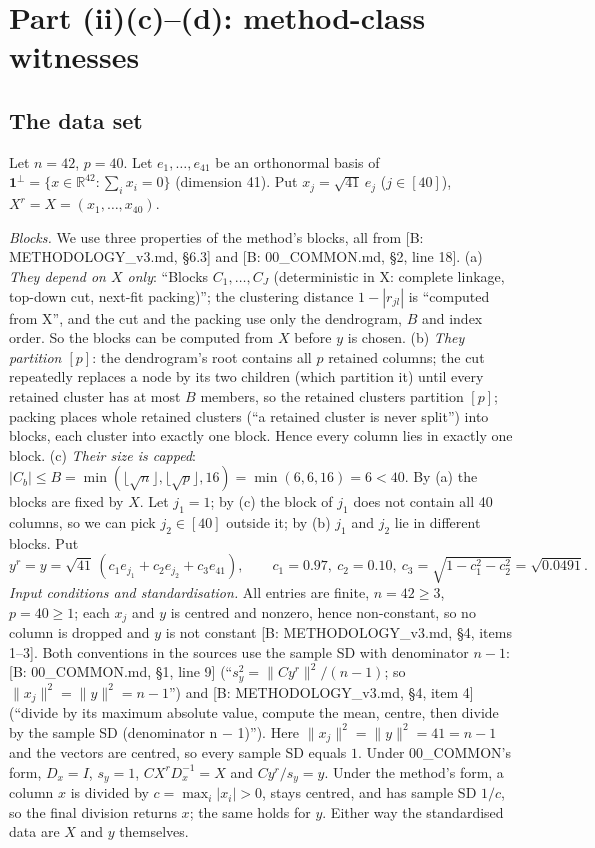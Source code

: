 \documentclass[11pt]{report}
\begin{document}
\section{Part (ii)(c)--(d): method-class witnesses}

\subsection{The data set}
Let $n=42$, $p=40$. Let $e_1,\dots,e_{41}$ be an orthonormal basis of $\mathbf 1^\perp=\{x\in\mathbb R^{42}:\sum_i x_i=0\}$ (dimension 41). Put $x_j=\sqrt{41}\,e_j$ ($j\in[40]$), $X^r=X=(x_1,\dots,x_{40})$.

\emph{Blocks.} We use three properties of the method's blocks, all from [B: METHODOLOGY\_v3.md, \S6.3] and [B: 00\_COMMON.md, \S2, line 18].
(a) \emph{They depend on $X$ only}: ``Blocks $C_1,\dots,C_J$ (deterministic in X: complete linkage, top-down cut, next-fit packing)''; the clustering distance $1-|r_{jl}|$ is ``computed from X'', and the cut and the packing use only the dendrogram, $B$ and index order. So the blocks can be computed from $X$ before $y$ is chosen.
(b) \emph{They partition $[p]$}: the dendrogram's root contains all $p$ retained columns; the cut repeatedly replaces a node by its two children (which partition it) until every retained cluster has at most $B$ members, so the retained clusters partition $[p]$; packing places whole retained clusters (``a retained cluster is never split'') into blocks, each cluster into exactly one block. Hence every column lies in exactly one block.
(c) \emph{Their size is capped}: $|C_b|\le B=\min(\lfloor\sqrt n\rfloor,\lfloor\sqrt p\rfloor,16)=\min(6,6,16)=6<40$.
By (a) the blocks are fixed by $X$. Let $j_1=1$; by (c) the block of $j_1$ does not contain all 40 columns, so we can pick $j_2\in[40]$ outside it; by (b) $j_1$ and $j_2$ lie in different blocks. Put
\[
y^r=y=\sqrt{41}\,(c_1e_{j_1}+c_2e_{j_2}+c_3e_{41}),\qquad c_1=0.97,\ c_2=0.10,\ c_3=\sqrt{1-c_1^2-c_2^2}=\sqrt{0.0491}.
\]
\emph{Input conditions and standardisation.} All entries are finite, $n=42\ge3$, $p=40\ge1$; each $x_j$ and $y$ is centred and nonzero, hence non-constant, so no column is dropped and $y$ is not constant [B: METHODOLOGY\_v3.md, \S4, items 1--3]. Both conventions in the sources use the sample SD with denominator $n-1$: [B: 00\_COMMON.md, \S1, line 9] (``$s_y^2=\|Cy^r\|^2/(n-1)$; so $\|x_j\|^2=\|y\|^2=n-1$'') and [B: METHODOLOGY\_v3.md, \S4, item 4] (``divide by its maximum absolute value, compute the mean, centre, then divide by the sample SD (denominator n $-$ 1)''). Here $\|x_j\|^2=\|y\|^2=41=n-1$ and the vectors are centred, so every sample SD equals $1$. Under 00\_COMMON's form, $D_x=I$, $s_y=1$, $CX^rD_x^{-1}=X$ and $Cy^r/s_y=y$. Under the method's form, a column $x$ is divided by $c=\max_i|x_i|>0$, stays centred, and has sample SD $1/c$, so the final division returns $x$; the same holds for $y$. Either way the standardised data are $X$ and $y$ themselves.
\end{document}
